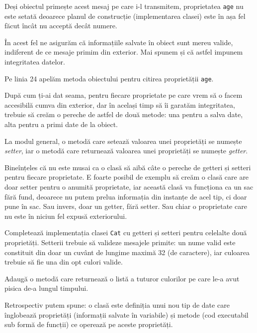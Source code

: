 Deși obiectul primește acest mesaj pe care i-l transmitem, proprietatea
\texttt{age} nu este setată deoarece planul de construcție (implementarea clasei)
este în așa fel făcut încât nu acceptă decât numere.

În acest fel ne asigurăm că informațiile salvate în obiect sunt mereu valide,
indiferent de ce mesaje primim din exterior. Mai spunem și că astfel
impunem integritatea datelor.

Pe linia 24 apelăm metoda obiectului pentru citirea proprietății \texttt{age}.

După cum ți-ai dat seama, pentru fiecare proprietate pe care vrem să
o facem accesibilă cumva din exterior, dar în același timp să îi garatăm
integritatea, trebuie să creăm o pereche de astfel de două metode: una
pentru a salva date, alta pentru a primi date de la obiect.

La modul general, o metodă care setează valoarea unei proprietăți se numește
\textsl{setter}, iar o metodă care returnează valoarea unei proprietăți se
numește \textsl{getter}.

Bineînțeles că nu este musai ca o clasă să aibă câte o pereche
de getteri și setteri pentru fiecare proprietate.
E foarte posibil de exemplu să creăm o clasă care are doar setter pentru
o anumită proprietate, iar această clasă va funcționa ca un sac
fără fund, deoarece nu putem prelua informația din instanțe
de acel tip, ci doar {\glqq}pune în sac{\grqq}. Sau invers, doar
un getter, fără setter. Sau chiar o proprietate care nu este în
niciun fel expusă exteriorului.

\begin{Exercise}[title={A complete Kitty}]
\ExePart
Completează implementația clasei \texttt{Cat} cu getteri și setteri
pentru celelalte două proprietăți. Setterii trebuie să valideze
mesajele primite: un nume valid este constituit din doar un cuvânt
de lungime maximă 32 (de caractere), iar culoarea trebuie
să fie una din opt culori valide.

\ExePart
Adaugă o metodă care returnează o listă a tuturor culorilor pe
care le-a avut pisica de-a lungul timpului.
\end{Exercise}


Retrospectiv putem spune: o clasă este definiția unui nou tip de date
care înglobează proprietăți (informații salvate în variabile) și
metode (cod executabil sub formă de funcții) ce operează pe aceste
proprietăți.


